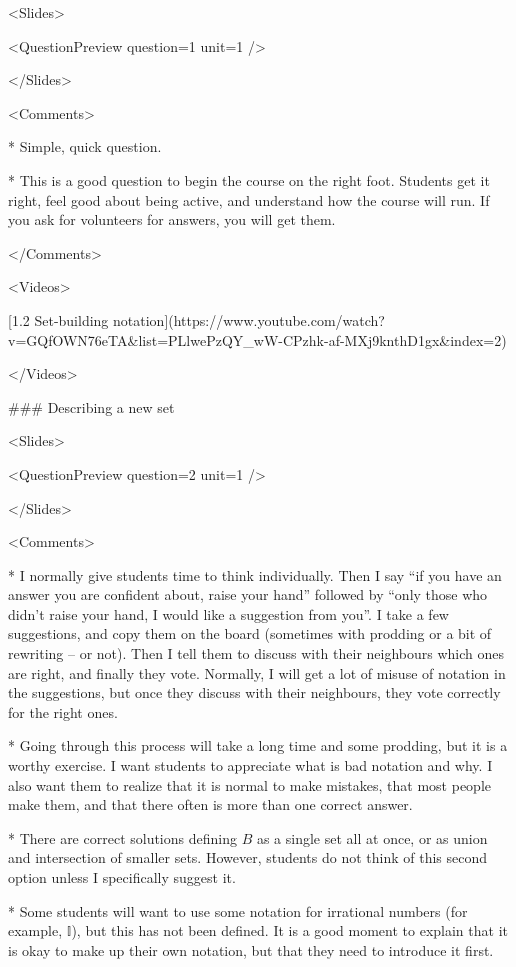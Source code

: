 <Slides>

<QuestionPreview question={1} unit={1} />

</Slides>

<Comments>

*   Simple, quick question.

*   This is a good question to begin the course on the right foot. Students get it right, feel good about being active, and understand how the course will run. If you ask for volunteers for answers, you will get them.

</Comments>

<Videos>

[1.2 Set-building notation](https://www.youtube.com/watch?v=GQfOWN76eTA\&list=PLlwePzQY_wW-CPzhk-af-MXj9knthD1gx\&index=2)

</Videos>

### Describing a new set

<Slides>

<QuestionPreview question={2} unit={1} />

</Slides>

<Comments>

*   I normally give students time to think individually. Then I say “if you have an answer you are confident about, raise your hand” followed by “only those who didn’t raise your hand, I would like a suggestion from you”. I take a few suggestions, and copy them on the board (sometimes with prodding or a bit of rewriting – or not). Then I tell them to discuss with their neighbours which ones are right, and finally they vote. Normally, I will get a lot of misuse of notation in the suggestions, but once they discuss with their neighbours, they vote correctly for the right ones.

*   Going through this process will take a long time and some prodding, but it is a worthy exercise. I want students to appreciate what is bad notation and why. I also want them to realize that it is normal to make mistakes, that most people make them, and that there often is more than one correct answer.

*   There are correct solutions defining $B$ as a single set all at once, or as union and intersection of smaller sets. However, students do not think of this second option unless I specifically suggest it.

*   Some students will want to use some notation for irrational numbers (for example, $\displaystyle \mathbb{I}$), but this has not been defined. It is a good moment to explain that it is okay to make up their own notation, but that they need to introduce it first.

